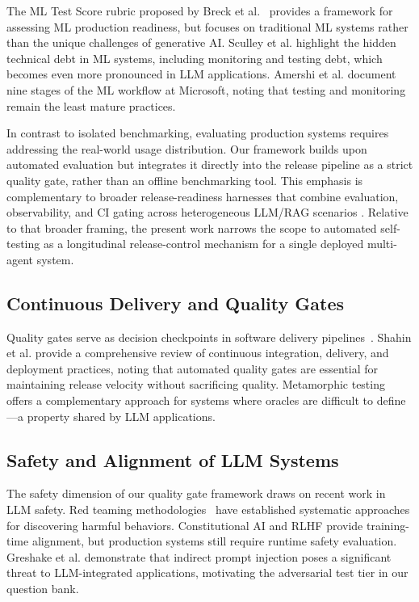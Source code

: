 The ML Test Score rubric proposed by Breck et al.~\cite{breck2017mltest} provides a framework for assessing ML production readiness, but focuses on traditional ML systems rather than the unique challenges of generative AI. Sculley et al. \cite{sculley2015debt} highlight the hidden technical debt in ML systems, including monitoring and testing debt, which becomes even more pronounced in LLM applications. Amershi et al. \cite{amershi2019se4ml} document nine stages of the ML workflow at Microsoft, noting that testing and monitoring remain the least mature practices.

In contrast to isolated benchmarking, evaluating production systems requires addressing the real-world usage distribution. Our framework builds upon automated evaluation but integrates it directly into the release pipeline as a strict quality gate, rather than an offline benchmarking tool.
This emphasis is complementary to broader release-readiness harnesses that combine evaluation, observability, and CI gating across heterogeneous LLM/RAG scenarios \cite{maiorano2026readiness}. Relative to that broader framing, the present work narrows the scope to automated self-testing as a longitudinal release-control mechanism for a single deployed multi-agent system.

\subsection{Continuous Delivery and Quality Gates}
Quality gates serve as decision checkpoints in software delivery pipelines~\cite{schermann2016qualitygates, shahin2017cicd}. Shahin et al. \cite{shahin2017cicd} provide a comprehensive review of continuous integration, delivery, and deployment practices, noting that automated quality gates are essential for maintaining release velocity without sacrificing quality. Metamorphic testing \cite{segura2016metamorphic} offers a complementary approach for systems where oracles are difficult to define---a property shared by LLM applications.

\subsection{Safety and Alignment of LLM Systems}
The safety dimension of our quality gate framework draws on recent work in LLM safety. Red teaming methodologies~\cite{ganguli2022redteaming, perez2022redteaming} have established systematic approaches for discovering harmful behaviors. Constitutional AI \cite{bai2022constitutional} and RLHF \cite{ouyang2022instructgpt} provide training-time alignment, but production systems still require runtime safety evaluation. Greshake et al. \cite{greshake2023injection} demonstrate that indirect prompt injection poses a significant threat to LLM-integrated applications, motivating the adversarial test tier in our question bank.

